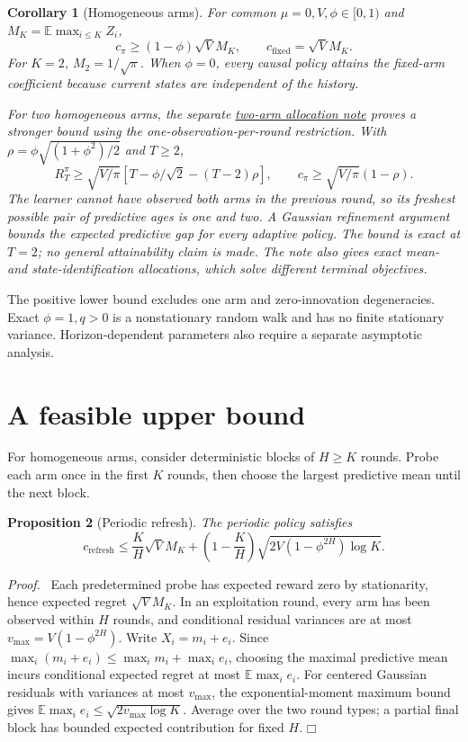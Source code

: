 \documentclass[11pt]{article}
\newtheorem{proposition}{Proposition}
\newtheorem{corollary}[proposition]{Corollary}
\newenvironment{proof}{\par\noindent\textit{Proof.}\ }{\hfill$\mdlgwhtsquare$\par\medskip}
\newcommand{\E}{\mathbb E}
\begin{document}
\begin{corollary}[Homogeneous arms]
For common $\mu=0,V,\phi\in[0,1)$ and $M_K=\E\max_{i\leq K}Z_i$,
\begin{equation}
c_\pi\geq(1-\phi)\sqrt V M_K,
\qquad c_{\mathrm{fixed}}=\sqrt V M_K.
\end{equation}
For $K=2$, $M_2=1/\sqrt\pi$. When $\phi=0$, every causal policy attains the fixed-arm coefficient because current states are independent of the history.

For two homogeneous arms, the separate \href{../two_arm_ar1/manuscript.pdf}{two-arm allocation note} proves a stronger bound using the one-observation-per-round restriction. With $\rho=\phi\sqrt{(1+\phi^2)/2}$ and $T\geq2$,
\[
R_T^\pi\geq\sqrt{V/\pi}\left[T-\phi/\sqrt2-(T-2)\rho\right],
\qquad c_\pi\geq\sqrt{V/\pi}(1-\rho).
\]
The learner cannot have observed both arms in the previous round, so its freshest possible pair of predictive ages is one and two. A Gaussian refinement argument bounds the expected predictive gap for every adaptive policy. The bound is exact at $T=2$; no general attainability claim is made. The note also gives exact mean- and state-identification allocations, which solve different terminal objectives.
\end{corollary}
The positive lower bound excludes one arm and zero-innovation degeneracies. Exact $\phi=1,q>0$ is a nonstationary random walk and has no finite stationary variance. Horizon-dependent parameters also require a separate asymptotic analysis.

\section{A feasible upper bound}
For homogeneous arms, consider deterministic blocks of $H\geq K$ rounds. Probe each arm once in the first $K$ rounds, then choose the largest predictive mean until the next block.

\begin{proposition}[Periodic refresh]
The periodic policy satisfies
\begin{equation}
c_{\mathrm{refresh}}\leq
\frac K H\sqrt V M_K+
\left(1-\frac K H\right)\sqrt{2V(1-\phi^{2H})\log K}.
\label{eq:upper}
\end{equation}
\end{proposition}
\begin{proof}
Each predetermined probe has expected reward zero by stationarity, hence expected regret $\sqrt V M_K$. In an exploitation round, every arm has been observed within $H$ rounds, and conditional residual variances are at most $v_{\max}=V(1-\phi^{2H})$. Write $X_i=m_i+e_i$. Since $\max_i(m_i+e_i)\leq\max_i m_i+\max_i e_i$, choosing the maximal predictive mean incurs conditional expected regret at most $\E\max_i e_i$. For centered Gaussian residuals with variances at most $v_{\max}$, the exponential-moment maximum bound gives $\E\max_i e_i\leq\sqrt{2v_{\max}\log K}$. Average over the two round types; a partial final block has bounded expected contribution for fixed $H$.
\end{proof}
\end{document}
